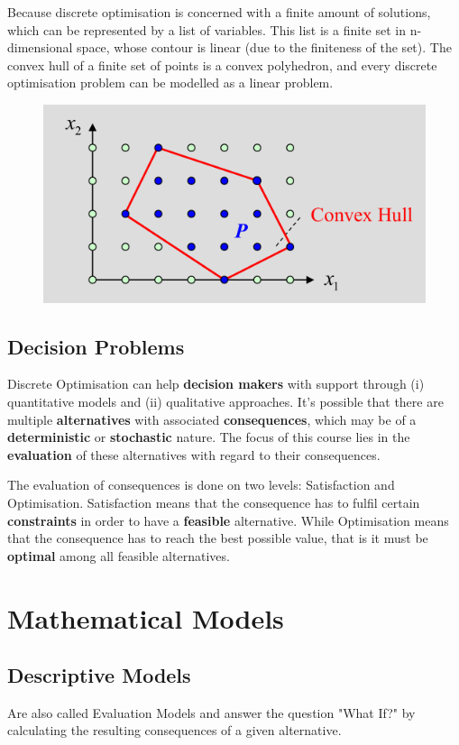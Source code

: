 \documentclass[11pt]{article}
\begin{document}
Because discrete optimisation is concerned with a finite amount of solutions, which can be represented by a list of variables. This list is a finite set in n-dimensional space, whose contour is linear (due to the finiteness of the set). The convex hull of a finite set of points is a convex polyhedron, and every discrete optimisation problem can be modelled as a linear problem.

\begin{figure}[htb]
	\centering
	\includegraphics[width=0.5\linewidth]{img/convex_hull}
	\caption[A convex hull]{}
	\label{fig:convexhull}
\end{figure}

\subsection{Decision Problems}
Discrete Optimisation can help \textbf{decision makers} with support through (i) quantitative models and (ii) qualitative approaches. It's possible that there are multiple \textbf{alternatives} with associated \textbf{consequences}, which may be of a \textbf{deterministic} or \textbf{stochastic} nature. The focus of this course lies in the \textbf{evaluation} of these alternatives with regard to their consequences.

The evaluation of consequences is done on two levels: Satisfaction and Optimisation. Satisfaction means that the consequence has to fulfil certain \textbf{constraints} in order to have a \textbf{feasible} alternative. While Optimisation means that the consequence has to reach the best possible value, that is it must be \textbf{optimal} among all feasible alternatives.

\section{Mathematical Models}
\subsection{Descriptive Models}
Are also called Evaluation Models and answer the question "What If?" by calculating the resulting consequences of a given alternative.
\end{document}
